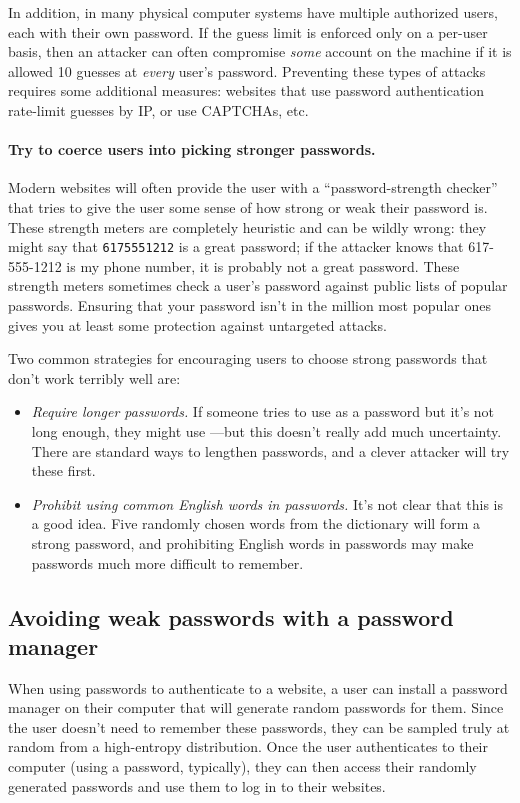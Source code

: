 In addition, in many physical computer systems have multiple authorized 
users, each with their own password.
If the guess limit is enforced only on a per-user basis, then an attacker
can often compromise \emph{some} account on the machine if it is allowed
10 guesses at \emph{every} user's password.
Preventing these types of attacks requires some additional measures: websites
that use password authentication rate-limit guesses by IP, or use CAPTCHAs, etc.

\paragraph{Try to coerce users into picking stronger passwords.}
Modern websites will often provide the user with a ``password-strength checker''
that tries to give the user some sense of how strong or weak their password is.
These strength meters are completely heuristic and can be wildly wrong:
they might say that \texttt{6175551212} is a great password; if the attacker
knows that 617-555-1212 is my phone number, it is probably not a great password.
These strength meters sometimes check a user's password against public lists of 
popular passwords. Ensuring that your password isn't in the million most popular
ones gives you at least some protection against untargeted attacks.

Two common strategies for encouraging users to choose strong passwords
that don't work terribly well are:
\begin{itemize}
  \item \emph{Require longer passwords.} If someone tries to use 
     as a password but it's not long
    enough, they might use ---but
    this doesn't really add much uncertainty.
    There are standard ways to lengthen passwords,
    and a clever attacker will try these first.
  \item \emph{Prohibit using common English words in passwords.}
    It's not clear that this is a good idea.
    Five randomly chosen words from the dictionary will
    form a strong password, and prohibiting English words
    in passwords may make passwords much more difficult to remember.

\end{itemize}

\subsection{Avoiding weak passwords with a password manager}
When using passwords to authenticate to a website, 
a user can install a password manager on their
computer that will generate random passwords for them.
Since the user doesn't need to remember these passwords,
they can be sampled truly at random from a high-entropy distribution.
Once the user authenticates to their computer (using a password, typically), 
they can then access their randomly generated passwords and
use them to log in to their websites. 

